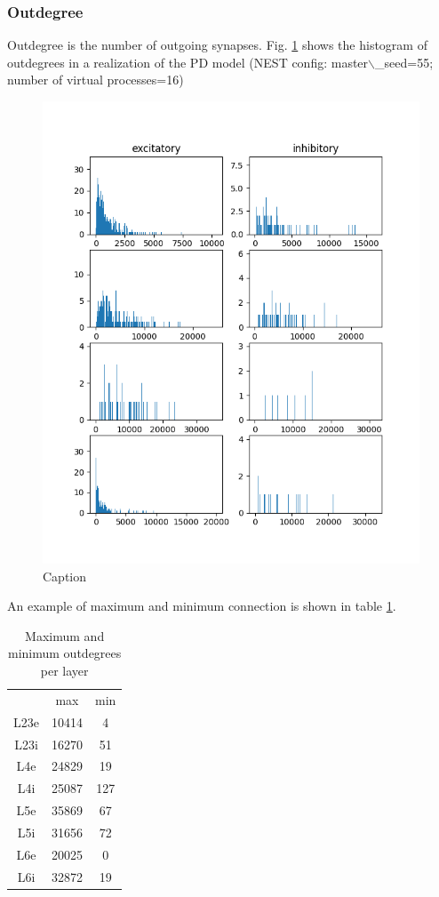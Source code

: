 \documentclass[11pt]{scrartcl}
\begin{document}
\subsubsection{Outdegree}
\label{sec:orgc683567}

Outdegree is the number of outgoing synapses. Fig. \ref{fig:PD_outdegree} shows the histogram of outdegrees in a realization of the PD model (NEST config: master$\backslash$\_seed=55; number of virtual processes=16)

\begin{figure}[h]
    \centering
    \includegraphics{figures/fig_outdegree.png}
    \caption{Caption}
    \label{fig:PD_outdegree}
\end{figure}

An example of maximum and minimum connection is shown in table \ref{table:PD_outdegree}.

\begin{table}[h]
    \centering
    \caption{Maximum and minimum outdegrees per layer}
    \label{table:PD_outdegree}
    \begin{tabular}{c||c|c}
         & max & min  \\
         L23e & 10414 & 4 \\
         L23i & 16270 & 51 \\
         L4e & 24829 & 19 \\
         L4i & 25087 & 127 \\
         L5e & 35869 & 67 \\
         L5i & 31656 & 72 \\
         L6e & 20025 & 0 \\
         L6i & 32872 & 19
    \end{tabular}
\end{table}
\end{document}
